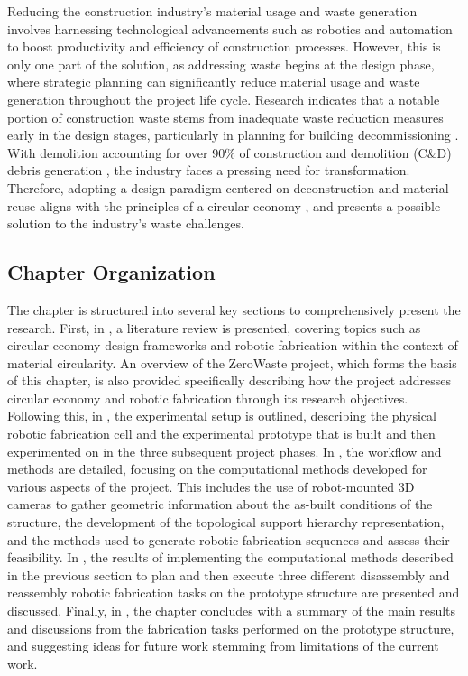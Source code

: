     Reducing the construction industry's material usage and waste generation involves harnessing technological advancements such as robotics and automation to boost productivity and efficiency of construction processes. However, this is only one part of the solution, as addressing waste begins at the design phase, where strategic planning can significantly reduce material usage and waste generation throughout the project life cycle. Research indicates that a notable portion of construction waste stems from inadequate waste reduction measures early in the design stages, particularly in planning for building decommissioning \citep{osmani_architects_2008}. With demolition accounting for over 90\% of construction and demolition (C\&D) debris generation \citep{us_epa_advancing_2020}, the industry faces a pressing need for transformation. Therefore, adopting a design paradigm centered on deconstruction and material reuse aligns with the principles of a circular economy \citep{geissdoerfer_circular_2017}, and presents a possible solution to the industry's waste challenges.

\subsection{Chapter Organization}
    The chapter is structured into several key sections to comprehensively present the research. First, in , a literature review is presented, covering topics such as circular economy design frameworks and robotic fabrication within the context of material circularity. An overview of the ZeroWaste project, which forms the basis of this chapter, is also provided specifically describing how the project addresses circular economy and robotic fabrication through its research objectives. Following this, in , the experimental setup is outlined, describing the physical robotic fabrication cell and the experimental prototype that is built and then experimented on in the three subsequent project phases. In , the workflow and methods are detailed, focusing on the computational methods developed for various aspects of the project. This includes the use of robot-mounted 3D cameras to gather geometric information about the as-built conditions of the structure, the development of the topological support hierarchy representation, and the methods used to generate robotic fabrication sequences and assess their feasibility. In , the results of implementing the computational methods described in the previous section to plan and then execute three different disassembly and reassembly robotic fabrication tasks on the prototype structure are presented and discussed. Finally, in , the chapter concludes with a summary of the main results and discussions from the fabrication tasks performed on the prototype structure, and suggesting ideas for future work stemming from limitations of the current work.



